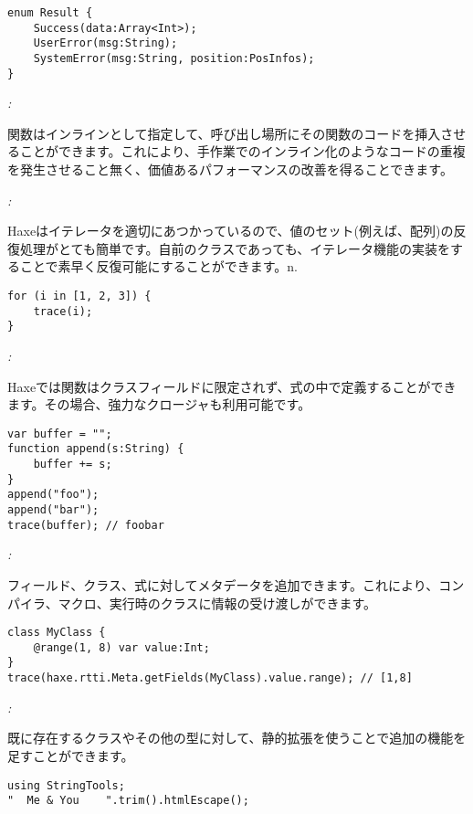 \begin{lstlisting}
enum Result {
    Success(data:Array<Int>);
    UserError(msg:String);
    SystemError(msg:String, position:PosInfos);
}
\end{lstlisting}

\emph{:}

関数はインラインとして指定して、呼び出し場所にその関数のコードを挿入させることができます。これにより、手作業でのインライン化のようなコードの重複を発生させること無く、価値あるパフォーマンスの改善を得ることできます。

\emph{:}

Haxeはイテレータを適切にあつかっているので、値のセット(例えば、配列)の反復処理がとても簡単です。自前のクラスであっても、イテレータ機能の実装をすることで素早く反復可能にすることができます。n.

\begin{lstlisting}
for (i in [1, 2, 3]) {
    trace(i);
}
\end{lstlisting}

\emph{:}

Haxeでは関数はクラスフィールドに限定されず、式の中で定義することができます。その場合、強力なクロージャも利用可能です。

\begin{lstlisting}
var buffer = "";
function append(s:String) {
    buffer += s;
}
append("foo");
append("bar");
trace(buffer); // foobar
\end{lstlisting}

\emph{:}

フィールド、クラス、式に対してメタデータを追加できます。これにより、コンパイラ、マクロ、実行時のクラスに情報の受け渡しができます。

\begin{lstlisting}
class MyClass {
    @range(1, 8) var value:Int;
}
trace(haxe.rtti.Meta.getFields(MyClass).value.range); // [1,8]
\end{lstlisting}

\emph{:}

既に存在するクラスやその他の型に対して、静的拡張を使うことで追加の機能を足すことができます。

\begin{lstlisting}
using StringTools;
"  Me & You    ".trim().htmlEscape();
\end{lstlisting}


